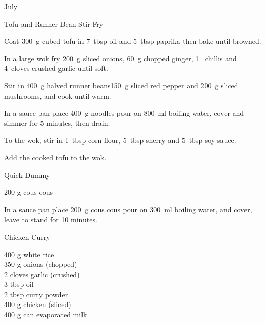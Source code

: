 \begin{menu}{July}
\begin{recipe}{2}{Tofu and Runner Bean Stir Fry}
    \begin{instructions}
    \item 
        Coat
        300~g cubed tofu
        in
        7~tbsp  oil
        and
        5~tbsp  paprika
        then bake until browned.
      \item 
        In a large wok fry 200~g sliced onions,
        60~g chopped ginger,
        1~  chillis
        and
        4~cloves crushed garlic
        until soft.
      \item 
        Stir in
        400~g halved runner beans150~g sliced red pepper
        and
        200~g sliced mushrooms,
        and cook until warm.
      \item 
    In a
    sauce pan
    place
    400~g  noodles
    pour on
    800~ml  boiling water,
    cover and simmer for 5 minutes, then drain.
  \item 
        To the wok, stir in
        1~tbsp  corn flour,
        5~tbsp  sherry
        and
        5~tbsp  soy sauce.
      \item 
        Add the cooked tofu to the wok.
      
    \end{instructions}
    \end{recipe}%
  
    \begin{recipe}{1}{Quick Dummy}%
		\begin{ingredients}
		200 g cous cous  \\
	
		\end{ingredients}
	
	
    \begin{instructions}
    \item 
    In a
    sauce pan 
    place
    200~g  cous cous
    pour on
    300~ml  boiling water,
    and cover, leave to stand for 10 minutes.
  
    \end{instructions}
    \end{recipe}%
  
    \begin{recipe}{2}{Chicken Curry}%
		\begin{ingredients}
		400 g white rice  \\
	350 g onions (chopped) \\
	2 cloves garlic (crushed) \\
	3 tbsp oil  \\
	2 tbsp curry powder  \\
	400 g chicken (sliced) \\
	400 g can evaporated milk  \\
	

\end{ingredients}
\end{recipe}
\end{menu}

